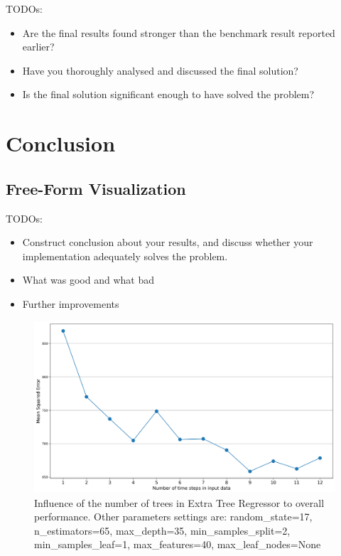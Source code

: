 \documentclass{article}
\begin{document}
\color{red}
TODOs:
\begin{itemize}
    \item Are the final results found stronger than the benchmark result reported earlier?
    \item Have you thoroughly analysed and discussed the final solution?
    \item Is the final solution significant enough to have solved the problem?
\end{itemize}
\color{black}

\section{Conclusion}

\subsection{Free-Form Visualization}
\color{red}
TODOs:
\begin{itemize}
    \item Construct conclusion about your results, and discuss whether your implementation adequately solves the problem.
    \item What was good and what bad
    \item Further improvements
\end{itemize}
\color{black}

\begin{figure}[h!]
\centering
\includegraphics[width=16cm]{imgs/ts_vs_mse.png}
\caption{Influence of the number of trees in Extra Tree Regressor to overall performance. Other parameters settings are: random\_state=17, n\_estimators=65, max\_depth=35, min\_samples\_split=2, min\_samples\_leaf=1, max\_features=40, max\_leaf\_nodes=None}
\label{fig:influence_trees}
\end{figure}
\end{document}
